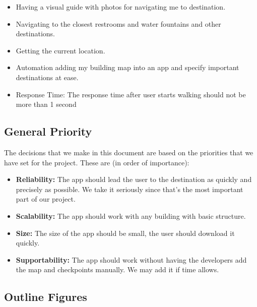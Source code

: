 \documentclass[12pt]{article}
\begin{document}
\begin{itemize}
\item Having a visual guide with photos for navigating me to destination.
\item Navigating to the closest restrooms and water fountains and other destinations.
\item Getting the current location.
\item Automation adding my building map into an app and specify important destinations at ease. 
\item Response Time: The response time after user starts walking should not be more than 1 second

\end{itemize}

\subsection{General Priority}
The decisions that we make in this document are based on the priorities that we have set for the
project. These are (in order of importance):
\begin{itemize}
\item \textbf{Reliability:} The app should lead the user to the destination as quickly and precisely as possible. We take it seriously since that's the most important part of our project.
\item \textbf{Scalability:} The app should work with any building with basic structure.
\item \textbf{Size:} The size of the app should be small, the user should download it quickly.
\item \textbf{Supportability:} The app should work without having the developers add the map and checkpoints manually. We may add it if time allows.
\end{itemize}

\subsection{Outline Figures}
\end{document}
